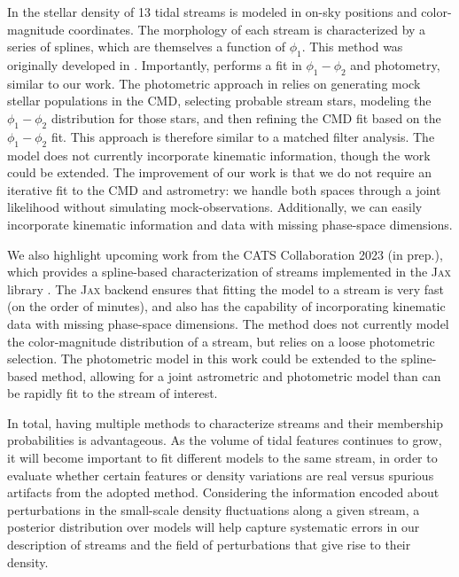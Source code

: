 \documentclass[twocolumn, linenumbers]{aastex631}
\newcommand{\code}[1]{\textsc{#1}}
\newcommand{\package}[1]{\code{#1}}
\begin{document}
        
        In \citet{Patrick+2022} the stellar density of 13 tidal streams is
        modeled in on-sky positions and color-magnitude coordinates. The
        morphology of each stream is characterized by a series of splines, which
        are themselves a function of $\phi_1$. This method was originally
        developed in \citet{Erkal+2017}.  Importantly, \citet{Patrick+2022}
        performs a fit in $\phi_1-\phi_2$ and photometry, similar to our work.
        The photometric approach in \citet{Patrick+2022} relies on generating
        mock stellar populations in the CMD, selecting probable stream stars,
        modeling the $\phi_1-\phi_2$ distribution for those stars, and then
        refining the CMD fit based on the $\phi_1-\phi_2$ fit. This approach is
        therefore similar to a matched filter analysis. The model does not
        currently incorporate kinematic information, though the work could be
        extended. The improvement of our work is that we do not require an
        iterative fit to the CMD and astrometry: we handle both spaces through a
        joint likelihood without simulating mock-observations. Additionally, we
        can easily incorporate kinematic information and data with missing
        phase-space dimensions.

        We also highlight upcoming work from the CATS Collaboration 2023 (in
        prep.), which provides a spline-based characterization of streams
        implemented in the \package{Jax} library \citep{jax2018github}. The
        \package{Jax} backend ensures that fitting the model to a stream is very
        fast (on the order of minutes), and also has the capability of
        incorporating kinematic data with missing phase-space dimensions. The
        method does not currently model the color-magnitude distribution of a
        stream, but relies on a loose photometric selection. The photometric
        model in this work could be extended to the spline-based method,
        allowing for a joint astrometric and photometric model than can be
        rapidly fit to the stream of interest. 
        
        
        In total, having multiple methods to characterize streams and their
        membership probabilities is advantageous. As the volume of tidal
        features continues to grow, it will become important to fit different
        models to the same stream, in order to evaluate whether certain features
        or density variations are real versus spurious artifacts from the
        adopted method. Considering the information encoded about perturbations
        in the small-scale density fluctuations along a given stream, a
        posterior distribution over models will help capture systematic errors
        in our description of streams and the field of perturbations that give
        rise to their density.  
\end{document}
